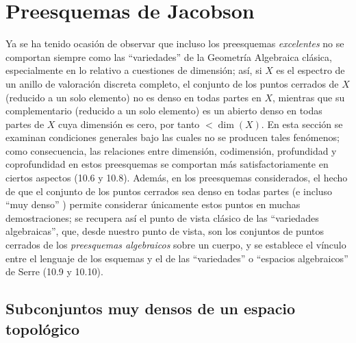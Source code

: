 \section{Preesquemas de Jacobson}
\label{section:IV.10}

Ya se ha tenido ocasión de observar  que incluso los
preesquemas \emph{excelentes}  no se comportan siempre como las
``variedades'' de la Geometría Algebraica clásica, especialmente en lo relativo
a cuestiones de dimensión; así, si $X$ es el espectro de un anillo de valoración
discreta completo, el conjunto de los puntos cerrados de $X$ (reducido a un solo
elemento) no es denso en todas partes en $X$, mientras que su complementario
(reducido a un solo elemento) es un abierto denso en todas partes de $X$ cuya
dimensión es cero, por tanto $<\dim(X)$. En esta sección se examinan condiciones
generales bajo las cuales no se producen tales fenómenos; como consecuencia,
las relaciones entre dimensión, codimensión, profundidad y coprofundidad en
estos preesquemas se comportan más satisfactoriamente en ciertos aspectos (10.6
y 10.8). Además, en los preesquemas considerados, el hecho de que el conjunto
de los puntos cerrados sea denso en todas partes (e incluso ``muy denso''
) permite considerar únicamente estos puntos en muchas
demostraciones; se recupera así el punto de vista clásico de las ``variedades
algebraicas'', que, desde nuestro punto de vista, son los conjuntos de puntos
cerrados de los \emph{preesquemas algebraicos} sobre un cuerpo, y se establece
el vínculo entre el lenguaje de los esquemas y el de las ``variedades'' o
``espacios algebraicos'' de Serre (10.9 y 10.10).

\subsection{Subconjuntos muy densos de un espacio topológico}
\label{subsection:IV.10.1}

